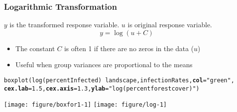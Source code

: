 \documentclass[color=usenames,dvipsnames]{beamer}\usepackage[]{graphicx}\usepackage[]{color}
\makeatletter
\newcommand{\hlnum}[1]{\textcolor[rgb]{0.69,0.494,0}{#1}}%
\newcommand{\hlstr}[1]{\textcolor[rgb]{0.749,0.012,0.012}{#1}}%
\newcommand{\hlopt}[1]{\textcolor[rgb]{0,0,0}{#1}}%
\newcommand{\hlstd}[1]{\textcolor[rgb]{0,0,0}{#1}}%
\newcommand{\hlkwc}[1]{\textcolor[rgb]{0,0,0}{\textbf{#1}}}%
\newcommand{\hlkwd}[1]{\textcolor[rgb]{0.004,0.004,0.506}{#1}}%
\newenvironment{kframe}{%
 \def\at@end@of@kframe{}%
 \ifinner\ifhmode%
  \def\at@end@of@kframe{\end{minipage}}%
  \begin{minipage}{\columnwidth}%
 \fi\fi%
 \def\FrameCommand##1{\hskip\@totalleftmargin \hskip-\fboxsep
 \colorbox{shadecolor}{##1}\hskip-\fboxsep
     \hskip-\linewidth \hskip-\@totalleftmargin \hskip\columnwidth}%
 \MakeFramed {\advance\hsize-\width
   \@totalleftmargin\z@ \linewidth\hsize
   \@setminipage}}%
 {\par\unskip\endMakeFramed%
 \at@end@of@kframe}
\newenvironment{knitrout}{}{} %
\makeatother
\begin{document}
\begin{frame}[fragile]
  \frametitle{Logarithmic Transformation}
  \small
  $y$ is the transformed response variable. $u$ is original response variable.
  \[
  y = \log(u + C)
  \]
  \vspace{-5mm}
  \begin{itemize}%
    \small %
    \item The constant $C$ is often 1 if there are no zeros in the data ($u$)
    \item Useful when group variances are proportional to the means
  \end{itemize}
  \pause
\begin{knitrout}\scriptsize
{}\color{fgcolor}\begin{kframe}
\begin{alltt}
\hlkwd{boxplot}\hlstd{(}\hlkwd{log}\hlstd{(percentInfected)}\hlopt{~}\hlstd{landscape, infectionRates,} \hlkwc{col}\hlstd{=}\hlstr{"green"}\hlstd{,}
      \hlkwc{cex.lab}\hlstd{=}\hlnum{1.5}\hlstd{,} \hlkwc{cex.axis}\hlstd{=}\hlnum{1.3}\hlstd{,} \hlkwc{ylab}\hlstd{=}\hlstr{"log(percent forest cover)"}\hlstd{)}
\end{alltt}
\end{kframe}
\end{knitrout}
\texttt{[image: figure/boxfor1-1]} \hfill
\texttt{[image: figure/log-1]} \\
\end{frame}



\end{document}
